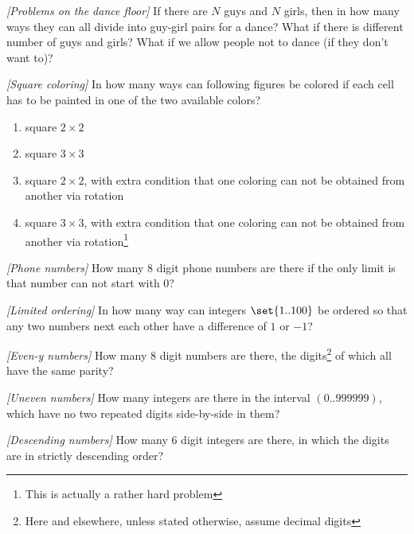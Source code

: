 \begin{problem}
\textit{[Problems on the dance floor]}
If there are $N$ guys and $N$ girls, then in how many ways they can all divide into guy-girl pairs for a dance? What if there is different number of guys and girls? What if we allow people not to dance (if they don't want to)?
\end{problem}
%


\begin{problem}
\textit{[Square coloring]}
In how many ways can following figures be colored if each cell has to be painted in one of the two available colors?
\begin{enumerate}
\item square $2 \times 2$
\item square $3 \times 3$
\item square $2 \times 2$, with extra condition that one coloring can not be obtained from another via rotation
\item square $3 \times 3$, with extra condition that one coloring can not be obtained from another via rotation\footnote{This is actually a rather hard problem}
\end{enumerate}
\end{problem}
%

\begin{problem}
\textit{[Phone numbers]}
How many $8$ digit phone numbers are there if the only limit is that number can not start with $0$?
\end{problem}
%

\begin{problem}
\textit{[Limited ordering]}
In how many way can integers $\set{1..100}$ be ordered so that any two numbers next each other have a difference of $1$ or $-1$?
\end{problem}
%

\begin{problem}
\textit{[Even-y numbers]}
How many $8$ digit numbers are there, the digits\footnote{Here and elsewhere, unless stated otherwise, assume decimal digits} of which all have the same parity?
\end{problem}
%

\begin{problem}
\textit{[Uneven numbers]}
How many integers are there in the interval $(0..999999)$, which have no two repeated digits side-by-side in them?
\end{problem}
%

\begin{problem}
\textit{[Descending numbers]}
How many $6$ digit integers are there, in which the digits are in strictly descending order?
\end{problem}
%

